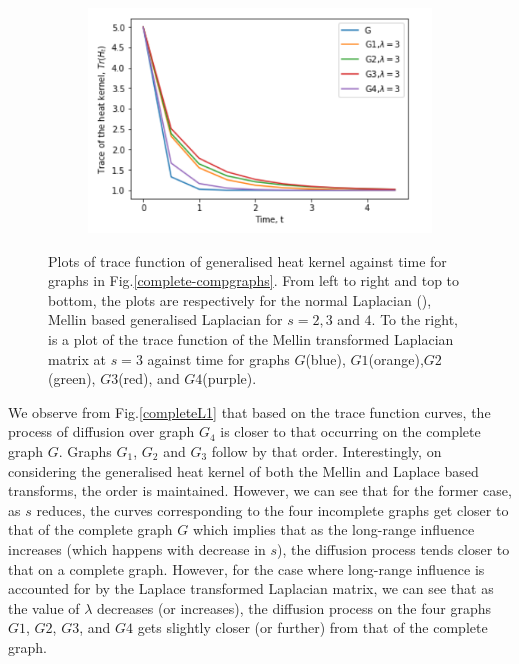 \documentclass[10pt,a4paper]{article}
\theoremstyle{plain}
\theoremstyle{definition}
\begin{document}
\begin{figure}[H]
\begin{subfigure}[b]{0.45\textwidth}
            	\includegraphics[width= \textwidth]{images/Laplace-complete-lam3.png}
            	\caption{}
            	\label{completeLaplace3}
            \end{subfigure}
         	\caption{Plots of trace function of generalised heat kernel against time for graphs in Fig.\ref{complete-compgraphs}.  From left to right and top to bottom, the plots are respectively for the normal Laplacian (), Mellin based generalised Laplacian for $s=2,3$ and $4$.  To the right, is a plot of the trace function of the Mellin transformed Laplacian matrix at $s=3$ against time for graphs $G$(blue), $G1$(orange),$G2$(green), $G3$(red), and $G4$(purple).}
         \end{figure}
         
         
         
         We observe from Fig.\ref{completeL1} that based on the trace function curves, the process of diffusion over graph $G_4$ is closer to that occurring on the complete graph $G$. Graphs $G_1$, $G_2$ and $G_3$ follow by that order. Interestingly, on considering the generalised heat kernel of both the Mellin and Laplace based transforms, the order is maintained. However, we can see that for the former case, as $s$ reduces, the curves corresponding to the four incomplete graphs get closer to that of the complete graph $G$ which implies that as the long-range influence increases (which happens with decrease in $s$), the diffusion process tends closer to that on a complete graph. However, for the case where long-range influence is accounted for by the Laplace transformed Laplacian matrix, we can see that as the value of $\lambda$ decreases (or increases), the diffusion process on the four graphs $G1$, $G2$, $G3$, and $G4$ gets slightly closer (or further) from that of the complete graph.
        
\end{document}
